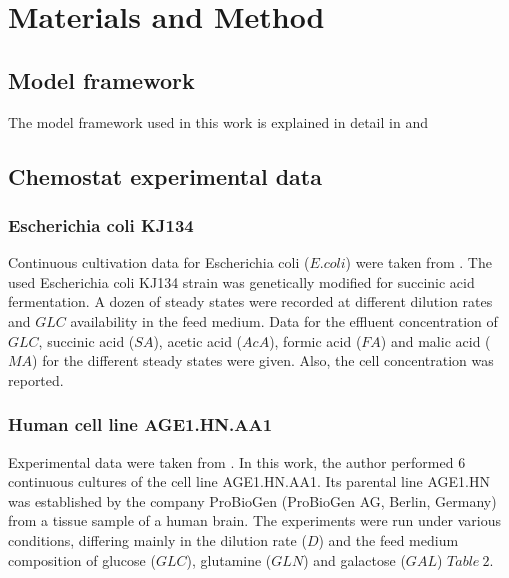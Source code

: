 \documentclass[]{article}
\begin{document}
	\section{Materials and Method}
	
	\subsection{Model framework }
	The model framework used in this work is explained in detail in \cite{fernandez-de-cossio-diazCharacterizingSteadyStates2017}  
	and \cite{fernandez-de-cossio-diazCellPopulationHeterogeneity2019}
	
	\subsection{Chemostat experimental data} 
	
	\subsubsection{Escherichia coli KJ134} 
	Continuous cultivation data for Escherichia coli ($E. coli$) were taken from \cite{vanheerdenContinuousBatchCultures2013}. 
	The used Escherichia coli KJ134 strain was genetically modified for succinic acid fermentation. A dozen of steady states 
	were recorded at different dilution rates and $GLC$ availability in the feed medium. Data for the effluent concentration 
	of $GLC$, succinic acid ($SA$), acetic acid ($AcA$), formic acid ($FA$) and malic acid ($MA$) for the different steady 
	states were given. Also, the cell concentration was reported.
	
	
	\subsubsection{Human cell line AGE1.HN.AA1} 
	Experimental data were taken from \cite{rathCharacterisationCellGrowth2017}. 
	In this work, the author performed 6 continuous cultures of the cell line AGE1.HN.AA1. 
	Its parental line AGE1.HN was established by the company ProBioGen (ProBioGen AG, Berlin, Germany) 
	from a tissue sample of a human brain. The experiments were run under various conditions, differing 
	mainly in the dilution rate ($D$) and the feed medium composition of glucose ($GLC$), glutamine 
	($GLN$) and galactose ($GAL$) $Table\ 2$.
	
\end{document}
